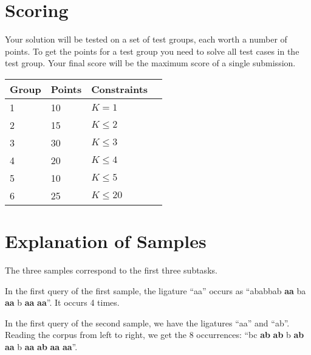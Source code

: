 \section*{Scoring}
Your solution will be tested on a set of test groups, each worth a number of points.
To get the points for a test group you need to solve all test cases in the test group.
Your final score will be the maximum score of a single submission.

\noindent
\begin{tabular}{| l | l | l | l |}
\hline
Group & Points & Constraints \\ \hline
1     & 10     & $K = 1$ \\ \hline
2     & 15     & $K \le 2$ \\ \hline
3     & 30     & $K \le 3$ \\ \hline
4     & 20     & $K \le 4$ \\ \hline
5     & 10     & $K \le 5$ \\ \hline
6     & 25     & $K \le 20$ \\ \hline
\end{tabular}

\section*{Explanation of Samples}
The three samples correspond to the first three subtasks.

In the first query of the first sample, the ligature ``aa'' occurs as ``ababbab \textbf{aa} ba \textbf{aa} b \textbf{aa} \textbf{aa}''.
It occurs 4 times.

In the first query of the second sample, we have the ligatures ``aa'' and ``ab''.
Reading the corpus from left to right, we get the 8 occurrences:
``bc \textbf{ab} \textbf{ab} b \textbf{ab} \textbf{aa} b \textbf{aa} \textbf{ab} \textbf{aa} \textbf{aa}''.

